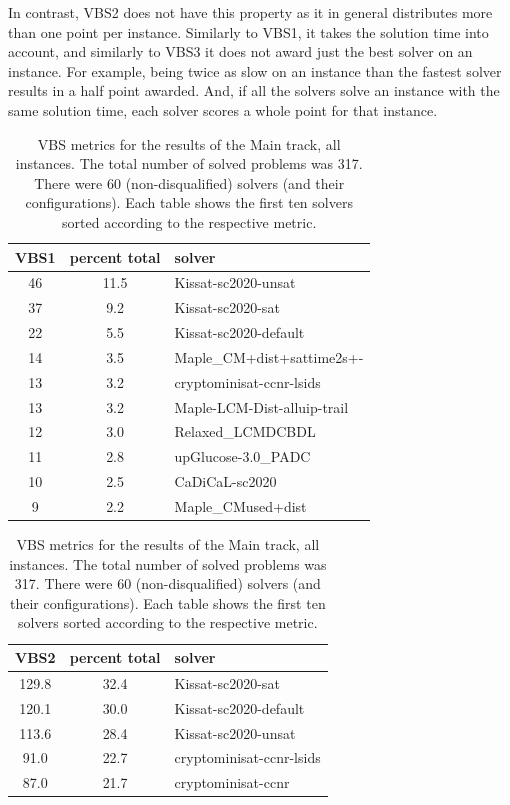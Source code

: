 \documentclass{elsarticle}
\begin{document}
In contrast, VBS2 does not have this property as it in general distributes more than one point per instance.
Similarly to VBS1, it takes the solution time into account,
and similarly to VBS3 it does not award just the best solver on an instance.
For example, being twice as slow on an instance than the fastest solver results in a half point awarded.
And, if all the solvers solve an instance with the same solution time,
each solver scores a whole point for that instance. 

\begin{table}
\caption{VBS metrics for the results of the Main track, all instances. 
The total number of solved problems was 317. 
There were 60 (non-disqualified) solvers (and their configurations).
Each table shows the first ten solvers sorted according to the respective metric.}
\label{tab:vbsMainALL}
\begin{center}
\begin{tabular}{ccl}
VBS1 & percent total & solver \\
\hline
46 & 11.5 & Kissat-sc2020-unsat \\
37 & \phantom{0}9.2 & Kissat-sc2020-sat \\
22 & \phantom{0}5.5 & Kissat-sc2020-default \\
14 & \phantom{0}3.5 & Maple\_CM+dist+sattime2s+- \\
13 & \phantom{0}3.2 & cryptominisat-ccnr-lsids \\
13 & \phantom{0}3.2 & Maple-LCM-Dist-alluip-trail \\
12 & \phantom{0}3.0 & Relaxed\_LCMDCBDL \\
11 & \phantom{0}2.8 & upGlucose-3.0\_PADC \\
10 & \phantom{0}2.5 & CaDiCaL-sc2020 \\
\phantom{0}9 & \phantom{0}2.2 & Maple\_CMused+dist \\
\end{tabular}
\end{center}
\begin{center}
\begin{tabular}{ccl}
VBS2 & percent total & solver \\
\hline
129.8 & 32.4 & Kissat-sc2020-sat \\
120.1 & 30.0 & Kissat-sc2020-default \\
113.6 & 28.4 & Kissat-sc2020-unsat \\
\phantom{0}91.0 & 22.7 & cryptominisat-ccnr-lsids \\
\phantom{0}87.0 & 21.7 & cryptominisat-ccnr \\

\end{tabular}
\end{center}
\end{table}
\end{document}
